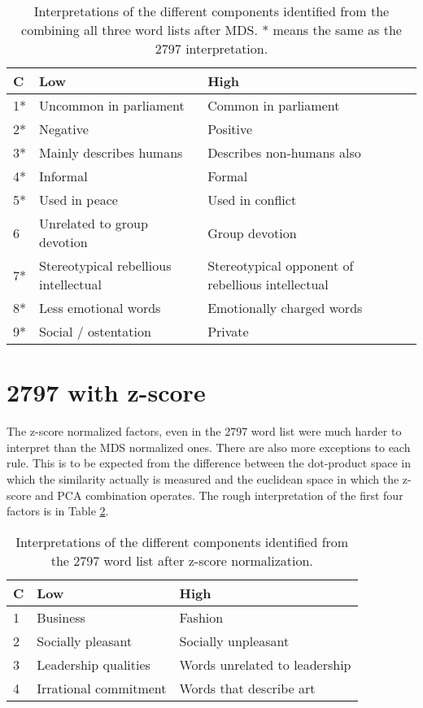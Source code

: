 \begin{table}[tbp]
\begin{tabular}{ | l |p{2in}|p{2in}|}
 \hline
 C & Low & High \\
 \hline
 1* & Uncommon in parliament & Common in parliament\\
 2* & Negative & Positive\\
 3* & Mainly describes humans & Describes non-humans also \\
 4* & Informal & Formal \\
 5* & Used in peace & Used in conflict \\
 6 & Unrelated to group devotion & Group devotion \\
 7* & Stereotypical rebellious intellectual & Stereotypical opponent of 
     rebellious intellectual \\
 8* & Less emotional words & Emotionally charged words \\
 9* & Social / ostentation & Private  \\
 \hline
\end{tabular}
 \caption{Interpretations of the different components identified from the combining
 all three word lists after MDS. * means the same as the 2797 interpretation.}
 \label{tab:2797and438and101mdsinterp}
\end{table}


\section{2797 with z-score}

The z-score normalized factors, even in the 2797 word list were much harder to 
interpret than the MDS normalized ones. There are also more exceptions to each 
rule. This is to be expected from the difference between the dot-product 
space in which the similarity actually is measured and the euclidean space in 
which the z-score and PCA combination operates. The rough interpretation of 
the first four factors is in Table \ref{tab:2797zscoreinterp}.

\begin{table}[tbp]
\begin{tabular}{ | l |p{2in}|p{2in}|}
 \hline
 C & Low & High \\
 \hline
 1 & Business & Fashion \\
 2 & Socially pleasant & Socially unpleasant \\
 3 & Leadership qualities & Words unrelated to leadership \\
 4 & Irrational commitment & Words that describe art \\
 \hline
\end{tabular}
 \caption{Interpretations of the different components identified from the 
 2797 word list after z-score normalization.}
 \label{tab:2797zscoreinterp}
\end{table}

